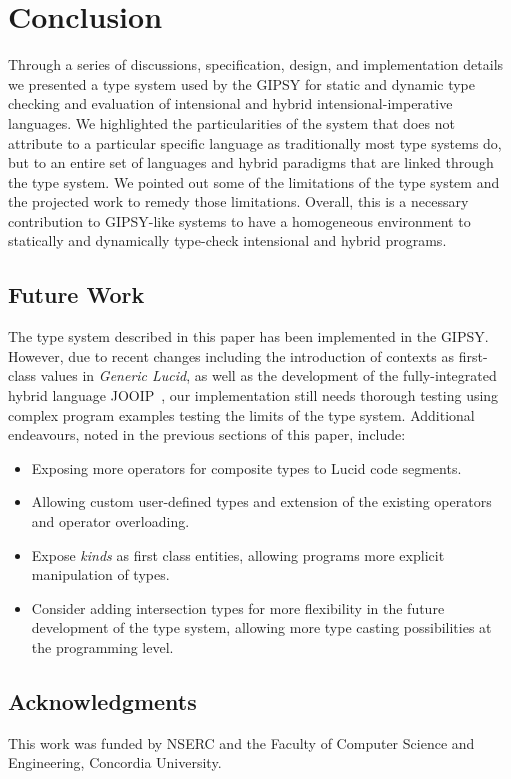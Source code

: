 \documentclass{easychair}
\newcommand{\gipsy}{{GIPSY\index{GIPSY}}}
\begin{document}
\section{Conclusion}

Through a series of discussions, specification, design, and implementation
details we presented a type system used by the {\gipsy} for static and
dynamic type checking and evaluation of intensional and hybrid intensional-imperative
languages. We highlighted the particularities of the system that does not
attribute to a particular specific language as traditionally most type
systems do, but to an entire set of languages and hybrid paradigms that
are linked through the type system. We pointed out some of the
limitations of the type system and the projected work to remedy
those limitations. Overall, this is a necessary contribution to
GIPSY-like systems to have a homogeneous environment to statically
and dynamically type-check intensional and hybrid programs.


\subsection{Future Work}

The type system described in this paper has been implemented in the GIPSY.
However, due to recent changes including the introduction of contexts as first-class
values in {\em Generic Lucid}, as well as the development of the fully-integrated
hybrid language JOOIP~\cite{gipsy-jooip-07}, our implementation still needs
thorough testing using complex program examples testing the limits of the
type system. Additional endeavours, noted in the previous sections of this paper, include: 

\begin{itemize}
\item
Exposing more operators for composite types to Lucid code segments.

\item
Allowing custom user-defined types and extension of the existing operators and operator overloading.

\item
Expose {\em kinds} as first class entities, allowing programs more explicit manipulation of types. 

\item
Consider adding intersection types for more flexibility in the future development of the type system, allowing more type casting possibilities at the programming level. 

\end{itemize}


\subsection{Acknowledgments}

This work was funded by NSERC and the Faculty of Computer Science and Engineering, Concordia University.


\label{sect:bib}


\end{document}
